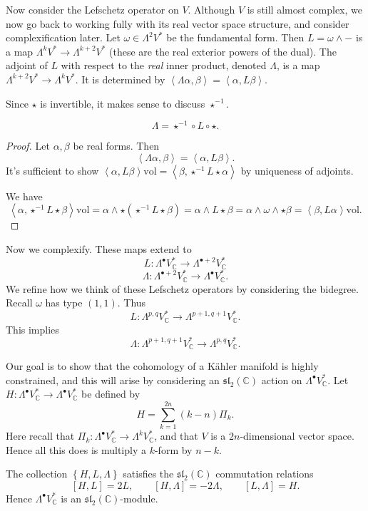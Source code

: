 Now consider the Lefschetz operator on $V$. Although $V$ is still almost complex, we now go back to working fully with its real vector space structure, and consider complexification later. Let $\omega \in \Lambda ^2V^*$ be the fundamental form. Then $L=\omega \wedge -$ is a map $\Lambda ^kV^*\to \Lambda ^{k+2} V^*$ (these are the real exterior powers of the dual). The adjoint of $L$ with respect to the \emph{real} inner product, denoted $\Lambda $, is a map $\Lambda ^{k+2} V^*\to \Lambda ^kV^*$. It is determined by $\left\langle \Lambda \alpha ,\beta  \right\rangle =\left\langle \alpha ,L\beta  \right\rangle $.

Since $\star $ is invertible, it makes sense to discuss $\star ^{-1} $.

\begin{proposition}\label{prp:5.0.7}
	\[
		\Lambda =\star ^{-1} \circ L\circ \star 
	.\]
\end{proposition}
\begin{proof}
	Let $\alpha ,\beta $ be real forms. Then
	\[
		\left\langle \Lambda \alpha ,\beta  \right\rangle =\left\langle \alpha ,L\beta  \right\rangle 
	.\]
	It's sufficient to show $\left\langle \alpha ,L\beta \right\rangle \mathrm{vol} =\left\langle \beta  ,\star ^{-1} L\star \alpha  \right\rangle $ by uniqueness of adjoints.

	We have
	\[
		\left\langle \alpha ,\star ^{-1} L\star \beta  \right\rangle \mathrm{vol} =\alpha \wedge \star \left(\star^{-1}  L\star \beta \right)=\alpha \wedge L\star \beta =\alpha \wedge \omega \wedge \star \beta =\left\langle \beta ,L\alpha  \right\rangle \mathrm{vol}
	.\]
\end{proof}

Now we complexify. These maps extend to
\[
	L : \Lambda ^{\bullet} V^*_\mathbb{C}  \to \Lambda ^{\bullet+2} V^*_\mathbb{C} 
\]
\[
	\Lambda : \Lambda ^{\bullet+2}V^*_\mathbb{C}  \to \Lambda ^{\bullet} V^*_\mathbb{C} 
.\]
We refine how we think of these Lefschetz operators by considering the bidegree. Recall $\omega $ has type $(1,1)$. Thus
\[
	L : \Lambda ^{p,q} V^*_\mathbb{C}  \to \Lambda ^{p+1,q+1} V^*_\mathbb{C} 
.\]
This implies
\[
	\Lambda : \Lambda ^{p+1,q+1} V^*_\mathbb{C}  \to \Lambda ^{p,q} V^*_\mathbb{C} 
.\]

Our goal is to show that the cohomology of a K\"ahler manifold is highly constrained, and this will arise by considering an $\mathfrak{sl} _2(\mathbb{C} )$ action on $\Lambda ^{\bullet} V^*_\mathbb{C} $. Let $H : \Lambda ^{\bullet} V^*_\mathbb{C}  \to \Lambda ^{\bullet} V^*_\mathbb{C} $ be defined by
\[
	H=\sum_{k=1}^{2n} (k-n)\Pi_k
.\]
Here recall that $\Pi _k : \Lambda ^{\bullet} V^*_\mathbb{C}  \to \Lambda ^kV^*_\mathbb{C} $, and that $V$ is a $2n$-dimensional vector space. Hence all this does is multiply a $k$-form by $n-k$.
\begin{proposition}\label{prp:5.0.8}
	The collection $\left\{ H,L,\Lambda  \right\} $ satisfies the $\mathfrak{sl} _2(\mathbb{C} )$ commutation relations
	\[
		[H,L] = 2L,\qquad [H,\Lambda ] = -2\Lambda ,\qquad [L,\Lambda ]=H
	.\]
	Hence $\Lambda ^{\bullet} V^*_\mathbb{C} $ is an $\mathfrak{sl} _2(\mathbb{C} )$-module.
\end{proposition}

